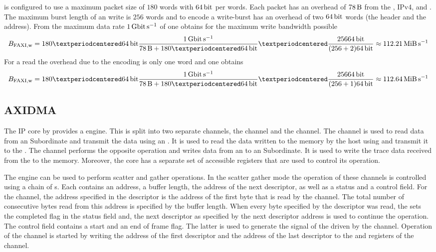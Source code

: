 \HostARQ{} is configured to use a maximum packet size of $\num{180}$ words with $\PhyWordSize{}$ per words.
Each packet has an overhead of $\SI{78}{\byte}$ from the \Gigabitethernet{}, IPv4, \UDP{} and \HostARQ{}.
The maximum burst length of an \AXI{} write is $\num{256}$ words and to encode a write-burst \FAXI{} has an overhead of two $\PhyWordSize{}$ words (the header and the address). From the maximum data rate $\SI{1}{\giga\bit\per\second}$ of \Gigabitethernet{} one obtains for the maximum write bandwidth possible
\[
B_{\text{\FAXI{},w}} = \num{180} · \PhyWordSize{} \frac{\SI{1}{\giga\bit\per\second}}{\SI{78}{\byte} + 180 · \PhyWordSize{}} · \frac{256 \PhyWordSize{}}{(256 + 2) \PhyWordSize{}} \approx \SI{112.21}{\mebi\byte\per\second}
\]
For a read the overhead due to the \FAXI{} encoding is only one \PhyWordSize{} word and one obtains
\[
B_{\text{\FAXI{},w}} = \num{180} · \PhyWordSize{} \frac{\SI{1}{\giga\bit\per\second}}{\SI{78}{\byte} + 180 · \PhyWordSize{}} · \frac{256 \PhyWordSize{}}{(256 + 1) \PhyWordSize{}} \approx \SI{112.64}{\mebi\byte\per\second}
\]


\subsection{AXIDMA}\label{sec:AXIDMA}
The \AXIDMA{} IP core by \Xilinx{}\autocite{ref:axidma} provides a \DMA{} engine. This is split into two separate channels, the \MMToS{} channel and the \SToMM{} channel.
The \MMToS{} channel is used to read data from an \AXI{} Subordinate and transmit the data using an \AXIStream{}. It is used to read the data written to the \DDR{} memory by the host using \FAXI{} and transmit it to the \pbexec{}. The \SToMM{} channel performs the opposite operation and writes data from an \AXIStream{} to an \AXI{} Subordinate. It is used to write the trace data received from the \pbexec{} to the \DDR{} memory.
Moreover, the \AXIDMA{} core has a separate set of \AXILite{} accessible registers that are used to control its operation.

The \AXIDMA{} \DMA{} engine can be used to perform scatter and gather operations. In the scatter gather mode the operation of these channels is controlled using a chain of \descriptor{}s.
Each \descriptor{} contains an address, a buffer length, the address of the next descriptor, as well as a status and a control field. For the \MMToS{} channel, the address specified in the descriptor is the address of the first byte that is read by the channel. The total number of consecutive bytes read from this address is specified by the buffer length. When every byte specified by the descriptor was read, the \AXIDMA{} sets the completed flag in the status field and, the next descriptor as specified by the next descriptor address is used to continue the operation. The control field contains a start and an end of frame flag. The latter is used to generate the \TLAST{} signal of the \AXIStream{} driven by the \MMToS{} channel. Operation of the \MMToS{} channel is started by writing the address of the first descriptor and the address of the last descriptor to the \curdesc{} and \taildesc{} registers of the \MMToS{} channel.

